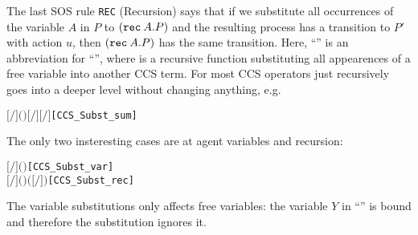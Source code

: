The last SOS rule \texttt{REC} (Recursion)
 says that if we substitute all occurrences of the variable $A$ in $P$ to
$({\tt rec}\: A . P)$ and the resulting process has a transition to $P'$
with action $u$, then $({\tt rec}\: A . P)$ has the same
transition. Here, ``'' is an abbreviation
for ``'', where  is a
recursive function substituting all appearences of a free variable
into another CCS term.
For most CCS operators  just recursively goes into a deeper
level without changing anything, e.g.
\begin{alltt}
\HOLTokenTurnstile{} \ensuremath{[}\ensuremath{/}\ensuremath{]} \ensuremath{(} \HOLSymConst{\ensuremath{+}} \ensuremath{)} \HOLSymConst{\ensuremath{=}} \ensuremath{[}\ensuremath{/}\ensuremath{]}  \HOLSymConst{\ensuremath{+}} \ensuremath{[}\ensuremath{/}\ensuremath{]} \hfill{[CCS_Subst_sum]}
\end{alltt}
The only two insteresting cases are at agent variables and recursion:
\begin{alltt}
\HOLTokenTurnstile{} \ensuremath{[}\ensuremath{/}\ensuremath{]} \ensuremath{(} \ensuremath{)} \HOLSymConst{\ensuremath{=}}   \HOLSymConst{\ensuremath{=}}      \hfill{[CCS_Subst_var]}
\HOLTokenTurnstile{} \ensuremath{[}\ensuremath{/}\ensuremath{]} \ensuremath{(}  \ensuremath{)} \HOLSymConst{\ensuremath{=}}   \HOLSymConst{\ensuremath{=}}         \ensuremath{(}\ensuremath{[}\ensuremath{/}\ensuremath{]} \ensuremath{)}\hfill{[CCS_Subst_rec]}
\end{alltt}
The variable substitutions only affects free
variables: the variable $Y$ in ``'' is
bound and therefore the substitution ignores it.

